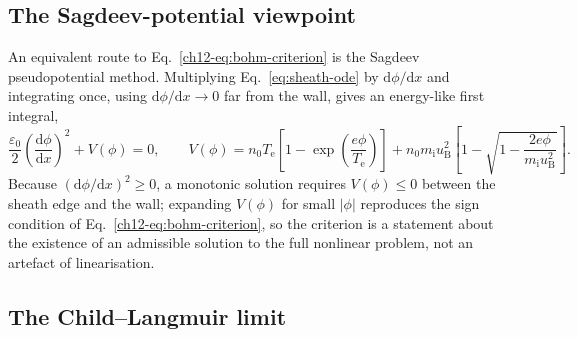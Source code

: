 \subsection{The Sagdeev-potential viewpoint}

An equivalent route to Eq.~\eqref{ch12-eq:bohm-criterion} is the Sagdeev pseudopotential method. Multiplying Eq.~\eqref{eq:sheath-ode} by $\mathrm{d}\phi/\mathrm{d}x$ and integrating once, using $\mathrm{d}\phi/\mathrm{d}x\to0$ far from the wall, gives an energy-like first integral,
\begin{equation}
\frac{\varepsilon_0}{2}\left(\frac{\mathrm{d}\phi}{\mathrm{d}x}\right)^2 + V(\phi) = 0, \qquad
V(\phi) = n_0T_{\mathrm{e}}\left[1-\exp\!\left(\frac{e\phi}{T_{\mathrm{e}}}\right)\right] + n_0m_{\mathrm{i}}u_{\mathrm{B}}^2\left[1-\sqrt{1-\frac{2e\phi}{m_{\mathrm{i}}u_{\mathrm{B}}^2}}\right].
\label{eq:sagdeev}
\end{equation}
Because $(\mathrm{d}\phi/\mathrm{d}x)^2\ge0$, a monotonic solution requires $V(\phi)\le0$ between the sheath edge and the wall; expanding $V(\phi)$ for small $|\phi|$ reproduces the sign condition of Eq.~\eqref{ch12-eq:bohm-criterion}, so the criterion is a statement about the existence of an admissible solution to the full nonlinear problem, not an artefact of linearisation.

\subsection{The Child--Langmuir limit}

